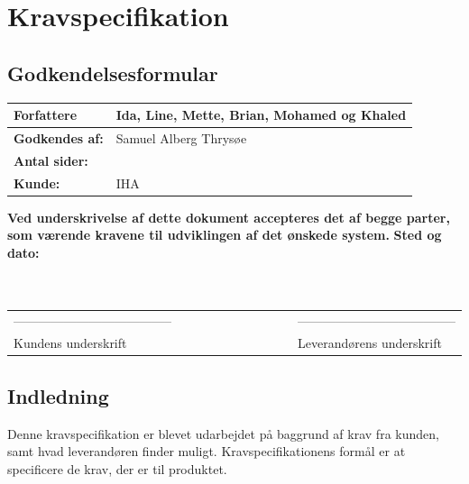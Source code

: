 \chapter{Kravspecifikation}
\section{Godkendelsesformular}
\begin{table}[h!]
\label{tab:tabel2}
\begin{tabular}{| l | >{\raggedright\arraybackslash}p{12cm} |}
   \hline
   \textbf{Forfattere} & Ida, Line, Mette, Brian, Mohamed og Khaled\\ \hline
   \textbf{Godkendes af:} & Samuel Alberg Thrysøe\\ \hline
   \textbf{Antal sider:} & 9 \\ \hline
   \textbf{Kunde:} & IHA\\ \hline
\end{tabular}
\end{table}
\textbf{Ved underskrivelse af dette dokument accepteres det af begge parter, som værende kravene til udviklingen af det ønskede system.}
\newline
\textbf{Sted og dato:}\\
\\
\\
\begin{table}
[h!]
\begin{tabular}{ l lllllllll l}
--------------------------------------&&&&&&&&&&--------------------------------------\\ 
Kundens underskrift &&&&&&&&&&Leverandørens underskrift\\
\end{tabular}
\end{table}
\section{Indledning}
Denne kravspecifikation er blevet udarbejdet på baggrund af krav fra kunden, samt hvad leverandøren finder muligt. Kravspecifikationens formål er at specificere de krav, der er til produktet. 
\newpage
